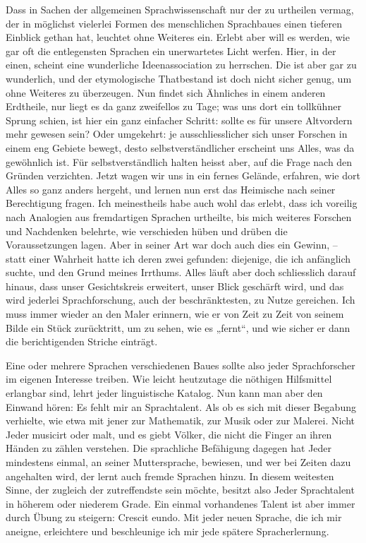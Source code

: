 Dass in Sachen der allgemeinen Sprachwissenschaft nur der zu urtheilen vermag, der in möglichst vielerlei Formen des menschlichen Sprachbaues einen tieferen Einblick gethan hat, leuchtet ohne Weiteres ein. Erlebt aber will es werden, wie gar oft die entlegensten Sprachen  ein unerwartetes Licht werfen. Hier, in der einen, scheint eine wunderliche Ideenassociation zu herrschen. Die ist aber gar zu wunderlich, und der etymologische Thatbestand ist doch nicht sicher genug, um ohne Weiteres zu überzeugen. Nun findet sich Ähnliches in einem anderen Erdtheile, nur liegt es da ganz zweifellos zu Tage; was uns dort ein tollkühner Sprung schien, ist hier ein ganz einfacher Schritt: sollte es für unsere Altvordern mehr gewesen sein? Oder umgekehrt: je ausschliesslicher sich unser Forschen in einem eng  Gebiete bewegt, desto selbstverständlicher erscheint uns Alles, was da gewöhnlich ist. Für selbstverständlich halten heisst aber, auf die Frage nach den Gründen verzichten. Jetzt wagen wir uns in ein fernes Gelände, erfahren, wie dort Alles so ganz anders hergeht, und lernen nun erst das Heimische nach seiner Berechtigung fragen. Ich meinestheils habe auch wohl das erlebt, dass ich voreilig nach Analogien aus fremdartigen Sprachen urtheilte, bis mich weiteres Forschen und Nachdenken belehrte, wie verschieden hüben und drüben die Voraussetzungen lagen. Aber in seiner Art war doch auch dies ein Gewinn, – statt einer Wahrheit hatte ich deren zwei gefunden: diejenige, die ich anfänglich suchte, \label{fp.51} und den Grund meines Irrthums. Alles läuft aber doch schliesslich darauf hinaus, dass unser Gesichtskreis erweitert, unser Blick geschärft wird, und das wird jederlei Sprachforschung, auch der beschränktesten, zu Nutze gereichen. Ich muss immer wieder an den Maler erinnern, wie er von Zeit zu Zeit von seinem Bilde ein Stück zurücktritt, um zu sehen, wie es „fernt“, und wie sicher er dann die berichtigenden Striche einträgt.

Eine oder  mehrere Sprachen verschiedenen Baues sollte also jeder Sprachforscher im eigenen Interesse treiben. Wie leicht heutzutage die nöthigen Hilfsmittel erlangbar sind, lehrt jeder linguistische Katalog. Nun kann man aber den Einwand hören: Es fehlt mir an Sprachtalent. Als ob es sich mit dieser Begabung verhielte, wie etwa mit jener zur Mathematik, zur Musik oder zur Malerei. Nicht Jeder musicirt oder malt, und es giebt Völker, die nicht die Finger an ihren Händen zu zählen verstehen. Die sprachliche Befähigung dagegen hat Jeder mindestens einmal, an seiner Muttersprache, bewiesen, und wer bei Zeiten dazu angehalten wird, der lernt auch fremde Sprachen hinzu. In diesem weitesten Sinne, der zugleich der zutreffendste sein möchte, besitzt also Jeder Sprachtalent in höherem oder niederem Grade. Ein einmal vorhandenes Talent ist aber immer durch Übung zu steigern: Crescit eundo. Mit jeder neuen Sprache, die ich mir aneigne, erleichtere und beschleunige ich mir jede spätere Spracherlernung.

